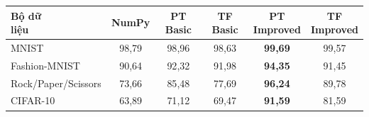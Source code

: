 \begin{tabular}{lccccc}
\toprule
\makecell[l]{Bộ dữ\\liệu} & NumPy & PT Basic & TF Basic & \makecell[c]{PT\\Improved} & \makecell[c]{TF\\Improved} \\
\midrule
MNIST & 98{,}79 & 98{,}96 & 98{,}63 & \textbf{99{,}69} & 99{,}57 \\
Fashion-MNIST & 90{,}64 & 92{,}32 & 91{,}98 & \textbf{94{,}35} & 91{,}45 \\
Rock/Paper/Scissors & 73{,}66 & 85{,}48 & 77{,}69 & \textbf{96{,}24} & 89{,}78 \\
CIFAR-10 & 63{,}89 & 71{,}12 & 69{,}47 & \textbf{91{,}59} & 81{,}59 \\
\bottomrule
\end{tabular}
